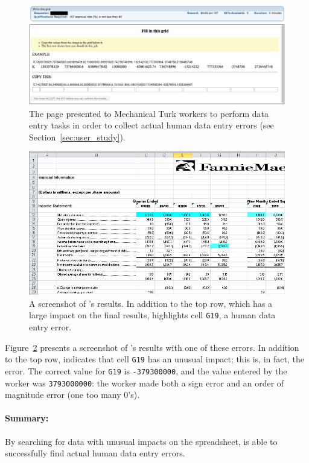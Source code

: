 \begin{figure}[!t]
\centering
\includegraphics[width=5.5in]{images/mturk_fuzz_task}
  \caption{The page presented to Mechanical Turk workers to perform data entry tasks in order to collect actual human data entry errors (see Section~\ref{sec:user_study}).\label{fig:mturk_task}}
\end{figure}


\begin{figure}[!t]
\centering
\includegraphics[width=5.5in]{images/fannie_mae_outlier}
  \caption{A screenshot of \checkcell{}'s results. In addition to the top row, which has a large impact on the final results, \checkcell{} highlights cell \texttt{G19}, a human data entry error.\label{fig:fannie_mae}}
\end{figure}

Figure~\ref{fig:fannie_mae} presents a screenshot of \checkcell{}'s
results with one of these errors. In addition to the top
row, \checkcell{} indicates that cell \texttt{G19} has an unusual
impact; this is, in fact, the error. The correct value
for \texttt{G19} is \texttt{-379300000}, and the value entered by the
worker was \texttt{3793000000}: the worker made both a sign error and
an order of magnitude error (one too many 0's).

\paragraph{Summary:} By searching for data with unusual impacts on the spreadsheet, \checkcell{} is able to successfully find actual human data entry errors.


